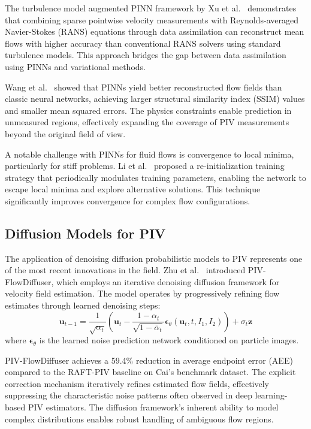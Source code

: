The turbulence model augmented PINN framework by Xu et al.~\cite{xu2024turbulence_pinn} demonstrates that combining sparse pointwise velocity measurements with Reynolds-averaged Navier-Stokes (RANS) equations through data assimilation can reconstruct mean flows with higher accuracy than conventional RANS solvers using standard turbulence models. This approach bridges the gap between data assimilation using PINNs and variational methods.

Wang et al.~\cite{wang2023pinn_reconstruction} showed that PINNs yield better reconstructed flow fields than classic neural networks, achieving larger structural similarity index (SSIM) values and smaller mean squared errors. The physics constraints enable prediction in unmeasured regions, effectively expanding the coverage of PIV measurements beyond the original field of view.

A notable challenge with PINNs for fluid flows is convergence to local minima, particularly for stiff problems. Li et al.~\cite{li2025pinn_reinit} proposed a re-initialization training strategy that periodically modulates training parameters, enabling the network to escape local minima and explore alternative solutions. This technique significantly improves convergence for complex flow configurations.

\subsection{Diffusion Models for PIV}

The application of denoising diffusion probabilistic models to PIV represents one of the most recent innovations in the field. Zhu et al.~\cite{zhu2025piv_flowdiffuser} introduced PIV-FlowDiffuser, which employs an iterative denoising diffusion framework for velocity field estimation. The model operates by progressively refining flow estimates through learned denoising steps:
\begin{equation}
\mathbf{u}_{t-1} = \frac{1}{\sqrt{\alpha_t}}\left(\mathbf{u}_t - \frac{1-\alpha_t}{\sqrt{1-\bar{\alpha}_t}}\boldsymbol{\epsilon}_\theta(\mathbf{u}_t, t, I_1, I_2)\right) + \sigma_t \mathbf{z}
\end{equation}
where $\boldsymbol{\epsilon}_\theta$ is the learned noise prediction network conditioned on particle images.

PIV-FlowDiffuser achieves a 59.4\% reduction in average endpoint error (AEE) compared to the RAFT-PIV baseline on Cai's benchmark dataset. The explicit correction mechanism iteratively refines estimated flow fields, effectively suppressing the characteristic noise patterns often observed in deep learning-based PIV estimators. The diffusion framework's inherent ability to model complex distributions enables robust handling of ambiguous flow regions.

